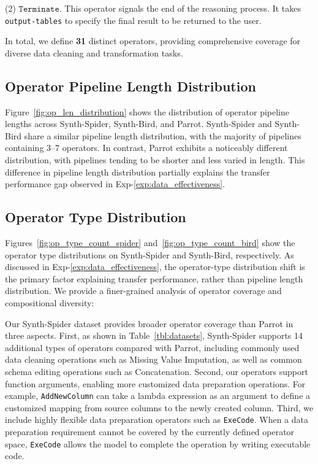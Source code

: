 (2) $\mathtt{Terminate}$.
    This operator signals the end of the reasoning process. It takes {\small\texttt{output-tables}} to specify the final result to be returned to the user.

In total, we define \textbf{31} distinct operators, providing comprehensive coverage for diverse data cleaning and transformation tasks.

\subsection{Operator Pipeline Length Distribution}
\label{subsec:appendix_pipeline_length}



Figure~\ref{fig:op_len_distribution} shows the distribution of operator pipeline lengths across Synth-Spider, Synth-Bird, and Parrot. Synth-Spider and Synth-Bird share a similar pipeline length distribution, with the majority of pipelines containing 3--7 operators. In contrast, Parrot exhibits a noticeably different distribution, with pipelines tending to be shorter and less varied in length. This difference in pipeline length distribution partially explains the transfer performance gap observed in Exp-\ref{exp:data_effectiveness}.

\subsection{Operator Type Distribution}
\label{subsec:appendix_operator_distribution}




Figures~\ref{fig:op_type_count_spider} and~\ref{fig:op_type_count_bird} show the operator type distributions on Synth-Spider and Synth-Bird, respectively. As discussed in Exp-\ref{exp:data_effectiveness}, the operator-type distribution shift is the primary factor explaining transfer performance, rather than pipeline length distribution. We provide a finer-grained analysis of operator coverage and compositional diversity:

Our Synth-Spider dataset provides broader operator coverage than Parrot in three aspects. First, as shown in Table~\ref{tbl:datasets}, Synth-Spider supports 14 additional types of operators compared with Parrot, including commonly used data cleaning operations such as Missing Value Imputation, as well as common schema editing operations such as Concatenation. Second, our operators support function arguments, enabling more customized data preparation operations. For example, \texttt{AddNewColumn} can take a lambda expression as an argument to define a customized mapping from source columns to the newly created column. Third, we include highly flexible data preparation operators such as \texttt{ExeCode}. When a data preparation requirement cannot be covered by the currently defined operator space, \texttt{ExeCode} allows the model to complete the operation by writing executable code.

